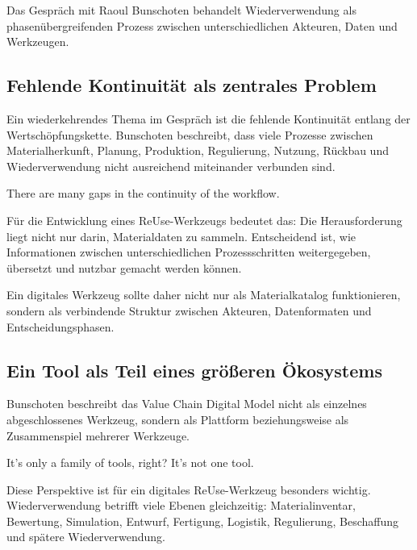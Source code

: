 \label{anlage:interview-bunschoten}

Das Gespräch mit Raoul Bunschoten behandelt Wiederverwendung als phasenübergreifenden Prozess zwischen unterschiedlichen Akteuren, Daten und Werkzeugen.

\subsection{Fehlende Kontinuität als zentrales Problem}

Ein wiederkehrendes Thema im Gespräch ist die fehlende Kontinuität entlang der Wertschöpfungskette. Bunschoten beschreibt, dass viele Prozesse zwischen Materialherkunft, Planung, Produktion, Regulierung, Nutzung, Rückbau und Wiederverwendung nicht ausreichend miteinander verbunden sind.

\begin{Blockquote}
There are many gaps in the continuity of the workflow.
\end{Blockquote}

Für die Entwicklung eines ReUse-Werkzeugs bedeutet das: Die Herausforderung liegt nicht nur darin, Materialdaten zu sammeln. Entscheidend ist, wie Informationen zwischen unterschiedlichen Prozessschritten weitergegeben, übersetzt und nutzbar gemacht werden können.

Ein digitales Werkzeug sollte daher nicht nur als Materialkatalog funktionieren, sondern als verbindende Struktur zwischen Akteuren, Datenformaten und Entscheidungsphasen.

\subsection{Ein Tool als Teil eines größeren Ökosystems}

Bunschoten beschreibt das Value Chain Digital Model nicht als einzelnes abgeschlossenes Werkzeug, sondern als Plattform beziehungsweise als Zusammenspiel mehrerer Werkzeuge.

\begin{Blockquote}
It's only a family of tools, right? It's not one tool.
\end{Blockquote}

Diese Perspektive ist für ein digitales ReUse-Werkzeug besonders wichtig. Wiederverwendung betrifft viele Ebenen gleichzeitig: Materialinventar, Bewertung, Simulation, Entwurf, Fertigung, Logistik, Regulierung, Beschaffung und spätere Wiederverwendung.


